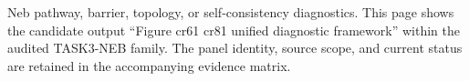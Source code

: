 Neb pathway, barrier, topology, or self-consistency diagnostics. This page shows the candidate output ``Figure cr61 cr81 unified diagnostic framework'' within the audited TASK3-NEB family. The panel identity, source scope, and current status are retained in the accompanying evidence matrix.
